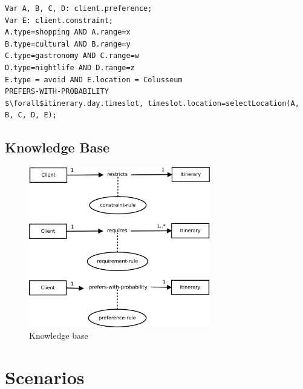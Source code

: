 \documentclass[11pt]{article} %
\begin{document}
\begin{lstlisting}[label=Rules,caption=The client expresses four preferences with four ranges (from 1 to 5). The method selectLocation will compose the itinerary selecting the locations that fits the preferences. For example it could select 3 shopping\, 1 gastronomy and 1 cultural locations.,breaklines=true,mathescape=true]
Var A, B, C, D: client.preference;
Var E: client.constraint;
A.type=shopping AND A.range=x
B.type=cultural AND B.range=y
C.type=gastronomy AND C.range=w
D.type=nightlife AND D.range=z
E.type = avoid AND E.location = Colusseum
PREFERS-WITH-PROBABILITY
$\forall$itinerary.day.timeslot, timeslot.location=selectLocation(A, B, C, D, E);
\end{lstlisting}

\subsection{Knowledge Base}

\begin{figure}[h]
\centering
\includegraphics[height=7cm]{images/knowledge_base.pdf}
\caption{Knowledge base}
\label{fig:knowledgebase}
\end{figure}



\section{Scenarios}
\end{document}
